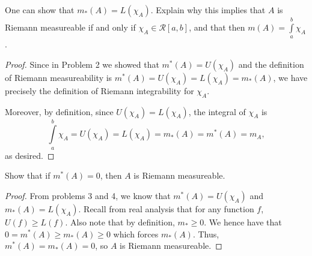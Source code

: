 \documentclass[12pt]{article}
\newenvironment{problem}[2][Problem]{\begin{trivlist}
    \item[\hskip \labelsep {\bfseries #1}\hskip \labelsep {\bfseries #2.}]}{\end{trivlist}}
\theoremstyle{definition}
\begin{document}
\begin{problem}{3}
  One can show that \( m_{*}(A) = L(\chi_A) \).
  Explain why this implies that \( A \) is Riemann measureable if and only if \(\chi_A \in \mathcal{R}[a,b]\), and that then \( m(A) = \int\limits_a^b \chi_A \).
\end{problem}
\begin{proof}
  Since in Problem 2 we showed that \( m^{*}(A) = U(\chi_A) \) and the definition of Riemann measureability is \( m^{*}(A) = U(\chi_{A}) = L(\chi_A) = m_{*}(A)\), we have precisely the definition of Riemann integrability for \( \chi_A \).

  Moreover, by definition, since \( U(\chi_A) = L(\chi_A) \), the integral of \( \chi_A \) is
  \begin{equation}
  \int\limits_a^b \chi_A = U(\chi_A) = L(\chi_A) = m_{*}(A) = m^{*}(A) = m_A,
  \end{equation}
  as desired.
\end{proof}

\begin{problem}{4}
  Show that if \( m^{*}(A) = 0 \), then \( A \) is Riemann measureable.
\end{problem}
\begin{proof}
  From problems 3 and 4, we know that \( m^{*}(A) = U(\chi_A) \) and \( m_{*}(A) = L(\chi_{A}) \).
  Recall from real analysis that for any function \( f \), \( U(f) \geq L(f) \).
  Also note that by definition, \( m_{*} \geq 0 \).
  We hence have that \( 0 = m^{*}(A) \geq m_{*}(A) \geq 0 \) which forces \( m_{*}(A) \).
  Thus, \( m^{*}(A) = m_{*}(A) = 0 \), so \( A \) is Riemann measureable.
\end{proof}
\end{document}
